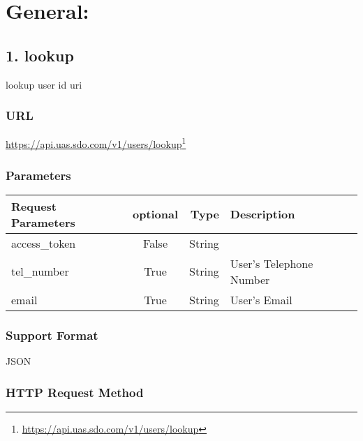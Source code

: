 \part{General:}
\label{general:}

\chapter{1. lookup}
\label{lookup}

lookup user id uri

\section{URL}
\label{url}

\href{https://api.uas.sdo.com/v1/users/lookup}{https:/\slash api.uas.sdo.com\slash v1\slash users\slash lookup}\footnote{\href{https://api.uas.sdo.com/v1/users/lookup}{https:/\slash api.uas.sdo.com\slash v1\slash users\slash lookup}}

\section{Parameters}
\label{parameters}

\begin{table}[htbp]
\begin{minipage}{\linewidth}
\setlength{\tymax}{0.5\linewidth}
\centering
\small
\begin{tabulary}{\textwidth}{@{}LCR@{}} \toprule
Request Parameters&optional&Type&Description\\
\midrule
access\_token&False&String&\\
tel\_number&True&String&User's Telephone Number\\
email&True&String&User's Email\\

\bottomrule

\end{tabulary}
\end{minipage}
\end{table}


\section{Support Format}
\label{supportformat}

JSON

\section{HTTP Request Method}
\label{httprequestmethod}

